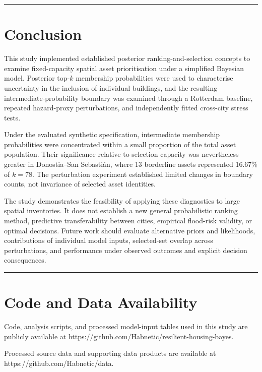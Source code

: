 \documentclass[
]{article}
\begin{document}
\begin{center}\rule{0.5\linewidth}{0.5pt}\end{center}

\section{Conclusion}\label{conclusion}

This study implemented established posterior ranking-and-selection
concepts to examine fixed-capacity spatial asset prioritisation under a
simplified Bayesian model. Posterior top-\(k\) membership probabilities
were used to characterise uncertainty in the inclusion of individual
buildings, and the resulting intermediate-probability boundary was
examined through a Rotterdam baseline, repeated hazard-proxy
perturbations, and independently fitted cross-city stress tests.

Under the evaluated synthetic specification, intermediate membership
probabilities were concentrated within a small proportion of the total
asset population. Their significance relative to selection capacity was
nevertheless greater in Donostia--San Sebastián, where 13 borderline
assets represented 16.67\% of \(k=78\). The perturbation experiment
established limited changes in boundary counts, not invariance of
selected asset identities.

The study demonstrates the feasibility of applying these diagnostics to
large spatial inventories. It does not establish a new general
probabilistic ranking method, predictive transferability between cities,
empirical flood-risk validity, or optimal decisions. Future work should
evaluate alternative priors and likelihoods, contributions of individual
model inputs, selected-set overlap across perturbations, and performance
under observed outcomes and explicit decision consequences.

\begin{center}\rule{0.5\linewidth}{0.5pt}\end{center}

\section{Code and Data Availability}\label{code-and-data-availability}

Code, analysis scripts, and processed model-input tables used in this
study are publicly available at
https://github.com/Habnetic/resilient-housing-bayes.

Processed source data and supporting data products are available at
https://github.com/Habnetic/data.
\end{document}

